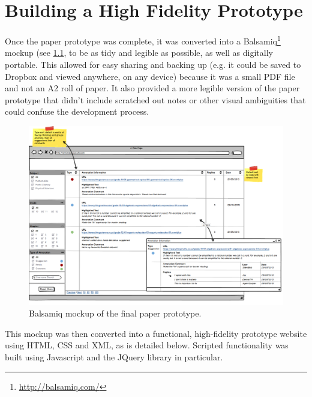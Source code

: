 
\chapter{Building a High Fidelity Prototype} %

\label{Building a High Fidelity Prototype} %



Once the paper prototype was complete, it was converted into a Balsamiq\footnote{\href{http://balsamiq.com/}{http://balsamiq.com/}} mockup (see \ref{fig:Balsamiq}, to be as tidy and legible as possible, as well as digitally portable. This allowed for easy sharing and backing up (e.g. it could be saved to Dropbox and viewed anywhere, on any device) because it was a small PDF file and not an A2 roll of paper. It also provided a more legible version of the paper prototype that didn't include scratched out notes or other visual ambiguities that could confuse the development process. 

\begin{figure}[h!]
    \centering
    \includegraphics[width=\textwidth]{Figures/BalsamiqMockup.png}
 \caption{Balsamiq mockup of the final paper prototype.	}
 \label{fig:Balsamiq}
\end{figure}

This mockup was then converted into a functional, high-fidelity prototype website using HTML, CSS and XML, as is detailed below. Scripted functionality was built using Javascript and the JQuery library in particular.  

